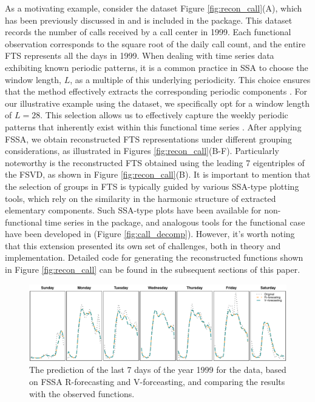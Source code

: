 As a motivating example, consider the  dataset Figure 
\ref{fig:recon_call}(A), which has been previously discussed in 
\cite{maadooliat2015integrating} and is included in the package. This dataset 
records the number of calls received by a call center in 1999. Each functional 
observation corresponds to the square root of the daily call count, and the entire 
FTS represents all the days in 1999. 
When dealing with time series data exhibiting known periodic patterns, it is a common practice in SSA to choose the window length, $L$, as a multiple of this underlying periodicity. This choice ensures that the method effectively extracts the corresponding periodic components \citep{golyandina2001}.
For our illustrative example using the  dataset, we specifically opt for a window length of $L=28$. This selection allows us to effectively capture the weekly periodic patterns that inherently exist within this functional time series \citep{haghbin2021}. After applying FSSA, we 
obtain reconstructed FTS representations under 
different grouping considerations, as illustrated in Figures 
\ref{fig:recon_call}(B-F). Particularly noteworthy is the reconstructed FTS obtained 
using the leading 7 eigentriples of the FSVD, as shown in Figure 
\ref{fig:recon_call}(B).
It is important to mention that the selection of groups in FTS is typically guided 
by 
various SSA-type plotting tools, which rely on the similarity in the harmonic 
structure of extracted elementary components. Such SSA-type plots have been 
available for non-functional time series in the  package, and analogous 
tools for the functional case have been developed in  (Figure 
\ref{fig:call_decomp}). However, it's worth noting that this 
extension presented its own set of challenges, both in theory and implementation. 
Detailed code for generating the reconstructed functions shown in Figure 
\ref{fig:recon_call} can be found in the subsequent sections of this paper.


\begin{figure}[t!]
	\centering
	\includegraphics[width=\textwidth]{figures/call_fc.pdf}
	\caption{The prediction of the last 7 days of the year 1999 for the 
		data, based on FSSA R-forecasting and V-forceasting, and comparing the 
		results 
		with the observed functions.}
	\label{fig:for_call}
\end{figure}
